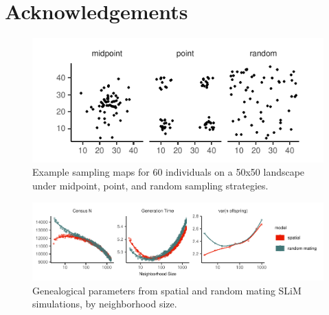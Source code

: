\documentclass[9pt,twocolumn,twoside,lineno]{gsajnl}
\begin{document}
\section{Acknowledgements}
\newpage

\begin{figure}[htbp]
\includegraphics{sampling_maps.pdf}
\caption{Example sampling maps for 60 individuals on a 50x50 landscape under midpoint, point, and random sampling strategies.}
\label{fig:spectrum}
\end{figure}

\begin{figure}[htbp]
\centering
\includegraphics[width=\textwidth]{pop_params.pdf}
\caption{Genealogical parameters from spatial and random mating SLiM simulations, by neighborhood size.}
\label{fig:spectrum}
\end{figure}
\end{document}
